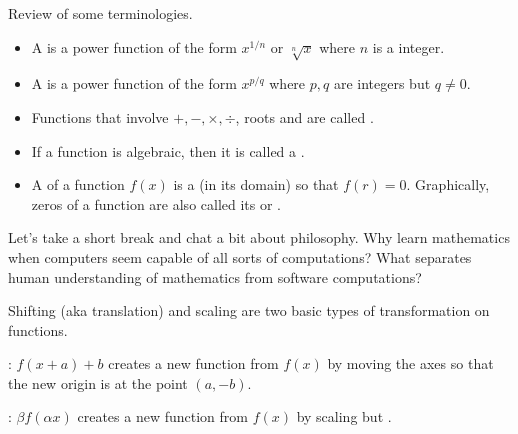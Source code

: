 \documentclass[../main.tex]{subfiles}
\begin{document}
Review of some terminologies. 
\begin{itemize}[wide, noitemsep]
  \item A  is a power function of the form \(x^{1/n}\) or \(\sqrt[n]{x}\) where \(n\) is a  integer. 


  \item A  is a power function of the form \(x^{p/q}\) where \(p,q\) are integers but \(q \ne 0\).


  \item Functions that involve \(+, -, \times, \div\), roots and  are called . 


  \item If a function is  algebraic, then it is called a .


  \item A  of a function \(f(x)\) is a  (in its domain) so that \(f(r) = 0\).  Graphically, zeros of a function are also called its  or \hlmain{\underline{\hspace{1in}}}.

\end{itemize}

Let's take a short break and chat a bit about philosophy. \faComments{} Why learn mathematics when computers seem capable of all sorts of computations? \faComments{} What separates human understanding of mathematics from software computations?

\clearpage

Shifting (aka translation) and scaling are two basic types of transformation on functions.

: \(f(x + a) + b\) creates a new function from \(f(x)\) by moving the axes so that the new origin is at the point \((a, -b)\).


: \(\beta f(\alpha x)\) creates a new function from \(f(x)\) by scaling  but .
\end{document}
